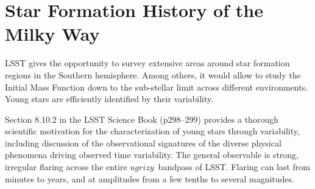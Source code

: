 %
%
%

\section{Star Formation History of the Milky Way}
\def\secname{MW_SFH}\label{sec:\secname}


\label{sec:\secname:targets}


LSST gives the opportunity to survey extensive areas
around star formation regions in the Southern hemisphere. Among
others, it would allow to study the Initial Mass Function down to the
sub-stellar limit across different environments. Young stars are
efficiently identified by their variability.

Section 8.10.2 in the LSST Science Book (p298--299) provides a
  thorough scientific motivation for the characterization of young
  stars through variability, including discussion of the observational
  signatures of the diverse physical phenomena driving observed time
  variability. The general observable is strong, irregular flaring
  across the entire $ugrizy$~bandpass of LSST. Flaring can last from
  minutes to years, and at amplitudes from a few tenths to several
  magnitudes.


